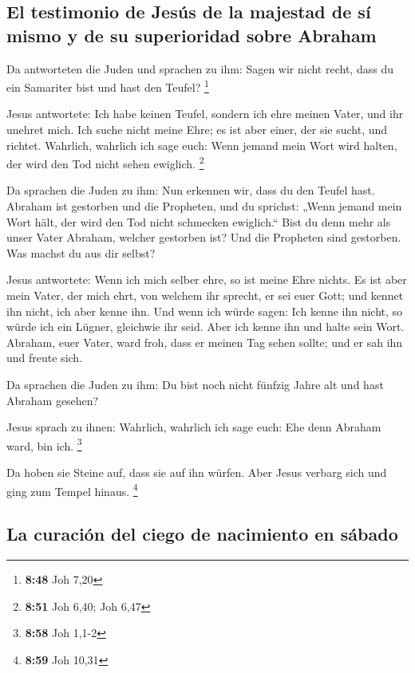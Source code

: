 \hypertarget{el-testimonio-de-jesuxfas-de-la-majestad-de-suxed-mismo-y-de-su-superioridad-sobre-abraham}{%
\subsection{El testimonio de Jesús de la majestad de sí mismo y de su
superioridad sobre
Abraham}\label{el-testimonio-de-jesuxfas-de-la-majestad-de-suxed-mismo-y-de-su-superioridad-sobre-abraham}}

 Da antworteten die Juden und sprachen zu ihm: Sagen wir
nicht recht, dass du ein Samariter bist und hast den Teufel? \footnote{\textbf{8:48}
  Joh 7,20}

 Jesus antwortete: Ich habe keinen Teufel, sondern ich
ehre meinen Vater, und ihr unehret mich.  Ich suche nicht
meine Ehre; es ist aber einer, der sie sucht, und richtet.
 Wahrlich, wahrlich ich sage euch: Wenn jemand mein Wort
wird halten, der wird den Tod nicht sehen ewiglich. \footnote{\textbf{8:51}
  Joh 6,40; Joh 6,47}

 Da sprachen die Juden zu ihm: Nun erkennen wir, dass du
den Teufel hast. Abraham ist gestorben und die Propheten, und du
sprichst: „Wenn jemand mein Wort hält, der wird den Tod nicht schmecken
ewiglich.``  Bist du denn mehr als unser Vater Abraham,
welcher gestorben ist? Und die Propheten sind gestorben. Was machst du
aus dir selbst?

 Jesus antwortete: Wenn ich mich selber ehre, so ist
meine Ehre nichts. Es ist aber mein Vater, der mich ehrt, von welchem
ihr sprecht, er sei euer Gott;  und kennet ihn nicht, ich
aber kenne ihn. Und wenn ich würde sagen: Ich kenne ihn nicht, so würde
ich ein Lügner, gleichwie ihr seid. Aber ich kenne ihn und halte sein
Wort.  Abraham, euer Vater, ward froh, dass er meinen Tag
sehen sollte; und er sah ihn und freute sich.

 Da sprachen die Juden zu ihm: Du bist noch nicht fünfzig
Jahre alt und hast Abraham gesehen?

 Jesus sprach zu ihnen: Wahrlich, wahrlich ich sage euch:
Ehe denn Abraham ward, bin ich. \footnote{\textbf{8:58} Joh 1,1-2}

 Da hoben sie Steine auf, dass sie auf ihn würfen. Aber
Jesus verbarg sich und ging zum Tempel hinaus. \footnote{\textbf{8:59}
  Joh 10,31}

\hypertarget{la-curaciuxf3n-del-ciego-de-nacimiento-en-suxe1bado}{%
\subsection{La curación del ciego de nacimiento en
sábado}\label{la-curaciuxf3n-del-ciego-de-nacimiento-en-suxe1bado}}

